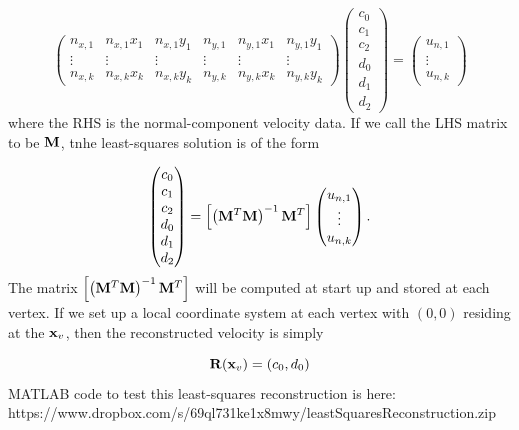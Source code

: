 \documentclass[11pt]{report}
\begin{document}
\begin{equation}
\begin{pmatrix} n_{x,1} & n_{x,1} x_1 & n_{x,1} y_1 &  n_{y,1} & n_{y,1} x_1 & n_{y,1} y_1  \\ 
                          \vdots & \vdots & \vdots & \vdots & \vdots & \vdots \\
                          n_{x,k} &  n_{x,k} x_k & n_{x,k} y_k & n_{y,k} & n_{y,k} x_k & n_{y,k} y_k
\end{pmatrix}
\begin{pmatrix} c_0 \\ c_1 \\ c_2 \\  d_0 \\ d_1 \\ d_2  \end{pmatrix} 
= 
\begin{pmatrix} u_{n,1} \\ \vdots \\ u_{n,k} \end{pmatrix}
\end{equation}
where the RHS is the normal-component velocity data. If we call the LHS matrix to be ${\bf M}$, tnhe least-squares solution is of the form

\begin{equation}
\begin{pmatrix} c_0 \\ c_1 \\ c_2 \\  d_0 \\ d_1 \\ d_2  \end{pmatrix}  = \left[ \left( {\bf M}^T {\bf M}\right)^{-1} {\bf M}^T \right] \begin{pmatrix} u_{n,1} \\ \vdots \\ u_{n,k} \end{pmatrix}.
\end{equation}
The matrix $\left[ \left( {\bf M}^T {\bf M}\right)^{-1} {\bf M}^T \right]$ will be computed at start up and stored at each vertex. If we set up a local coordinate system at each vertex with $(0,0)$ residing at the ${\bf x}_v$, then the reconstructed velocity is simply

\begin{equation}
{\bf R}({\bf x}_v) = (c_0, d_0)
\end{equation}
MATLAB code to test this least-squares reconstruction is here: \\
https://www.dropbox.com/s/69ql731ke1x8mwy/leastSquaresReconstruction.zip
\end{document}
